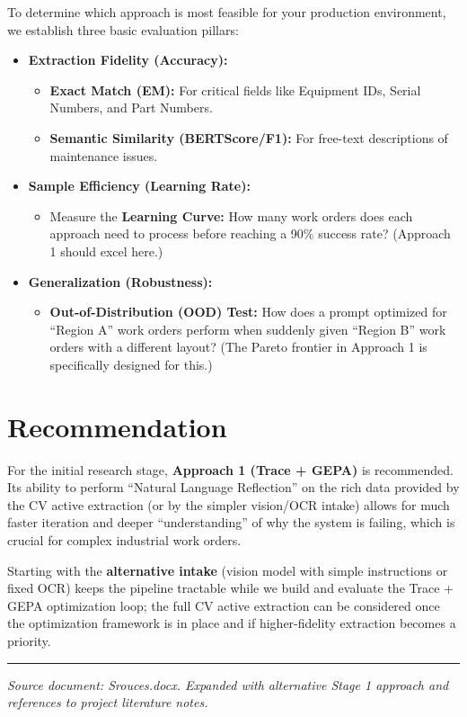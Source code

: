 \documentclass[11pt,a4paper]{article}
\begin{document}
To determine which approach is most feasible for your production environment, we establish three basic evaluation pillars:

\begin{itemize}
  \item \textbf{Extraction Fidelity (Accuracy):}
  \begin{itemize}
    \item \textbf{Exact Match (EM):} For critical fields like Equipment IDs, Serial Numbers, and Part Numbers.
    \item \textbf{Semantic Similarity (BERTScore/F1):} For free-text descriptions of maintenance issues.
  \end{itemize}
  \item \textbf{Sample Efficiency (Learning Rate):}
  \begin{itemize}
    \item Measure the \textbf{Learning Curve:} How many work orders does each approach need to process before reaching a 90\% success rate? (Approach 1 should excel here.)
  \end{itemize}
  \item \textbf{Generalization (Robustness):}
  \begin{itemize}
    \item \textbf{Out-of-Distribution (OOD) Test:} How does a prompt optimized for ``Region A'' work orders perform when suddenly given ``Region B'' work orders with a different layout? (The Pareto frontier in Approach 1 is specifically designed for this.)
  \end{itemize}
\end{itemize}

\section{Recommendation}

For the initial research stage, \textbf{Approach 1 (Trace + GEPA)} is recommended. Its ability to perform ``Natural Language Reflection'' on the rich data provided by the CV active extraction (or by the simpler vision/OCR intake) allows for much faster iteration and deeper ``understanding'' of why the system is failing, which is crucial for complex industrial work orders.

Starting with the \textbf{alternative intake} (vision model with simple instructions or fixed OCR) keeps the pipeline tractable while we build and evaluate the Trace + GEPA optimization loop; the full CV active extraction can be considered once the optimization framework is in place and if higher-fidelity extraction becomes a priority.

\vspace{1em}
\hrule
\vspace{0.5em}

\noindent \textit{Source document: Srouces.docx. Expanded with alternative Stage 1 approach and references to project literature notes.}
\end{document}
